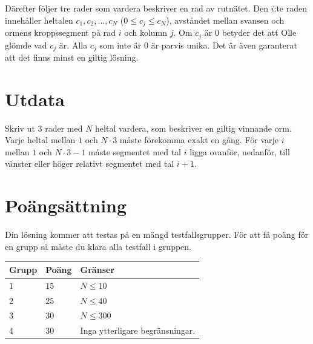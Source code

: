 Därefter följer tre rader som vardera beskriver en rad av rutnätet. Den $i$:te raden innehåller heltalen
$c_1, c_2, \dots, c_N$ ($0 \leq c_j \leq c_N$), avståndet mellan svansen och ormens kroppssegment på rad $i$ och kolumn $j$.
Om $c_j$ är $0$ betyder det att Olle glömde vad $c_j$ är. Alla $c_j$ som inte är $0$ är parvis unika. Det är även garanterat att det
finns minst en giltig lösning.

\section*{Utdata}
Skriv ut $3$ rader med $N$ heltal vardera, som beskriver en giltig vinnande orm. Varje heltal mellan $1$ och $N \cdot 3$
måste förekomma exakt en gång. För varje $i$ mellan $1$ och $N \cdot 3 - 1$ måste segmentet med tal $i$ ligga ovanför, nedanför,
till vänster eller höger relativt segmentet med tal $i+1$.

\section*{Poängsättning}
Din lösning kommer att testas på en mängd testfallsgrupper.
För att få poäng för en grupp så måste du klara alla testfall i gruppen.

\noindent
\begin{tabular}{| l | l | p{12cm} |}
  \hline
  \textbf{Grupp} & \textbf{Poäng} & \textbf{Gränser} \\ \hline
  $1$    & $15$         & $N \leq 10$  \\ \hline
  $2$    & $25$         & $N \leq 40$ \\ \hline
  $3$    & $30$         & $N \leq 300$ \\ \hline
  $4$    & $30$         & Inga ytterligare begränsningar. \\ \hline
\end{tabular}

